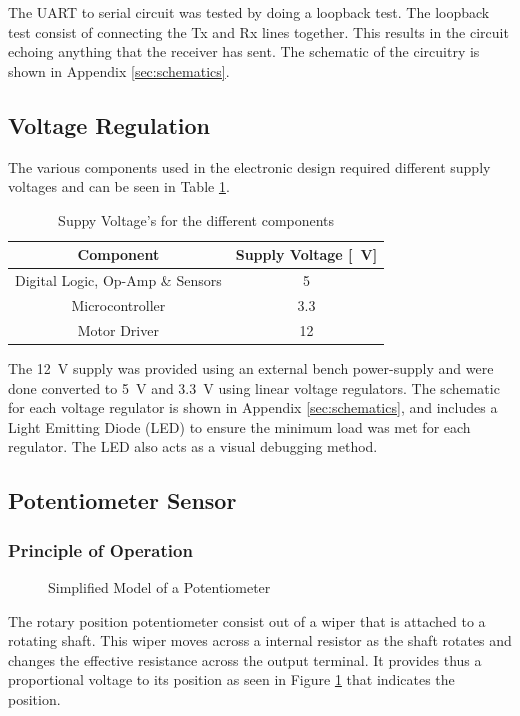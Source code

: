 The UART to serial circuit was tested by doing a loopback test. The loopback test consist of connecting the Tx and Rx lines together. This results in the circuit echoing anything that the receiver has sent. The schematic of the circuitry is shown in Appendix \ref{sec:schematics}.


\subsection{Voltage Regulation}

The various components used in the electronic design required different supply voltages and can be seen in Table \ref{table:supplyVoltage}.\\


\begin{table}[]
	\centering
	\begin{tabular}{|c|c|}
		\hline
		Component & Supply Voltage [\SI{}{V}] \\
		\hline
		\hline
		Digital Logic, Op-Amp \& Sensors & \SI{5}{} \\
		\hline
		Microcontroller & \SI{3.3}{} \\
		\hline
		Motor Driver & \SI{12}{} \\
		\hline
	\end{tabular}
	\caption{Suppy Voltage's for the different components}
	\label{table:supplyVoltage}
\end{table}

The \SI{12}{\volt} supply was provided using an external bench power-supply and were done converted to \SI{5}{V} and \SI{3.3}{V} using linear voltage regulators. The schematic for each voltage regulator is shown in Appendix \ref{sec:schematics}, and includes a Light Emitting Diode (LED) to ensure the minimum load was met for each regulator. The LED also acts as a visual debugging method.

\subsection{Potentiometer Sensor}
\subsubsection{Principle of Operation}
\begin{figure}[h]
	\centering
	
	\caption{Simplified Model of a Potentiometer}
	\label{fig:potentiometer}
\end{figure}
The rotary position potentiometer consist out of a wiper that is attached to a rotating shaft. This wiper moves across a internal resistor as the shaft rotates and changes the effective resistance across the output terminal. It provides thus a proportional voltage to its position as seen in Figure \ref{fig:potentiometer} that indicates the position.

